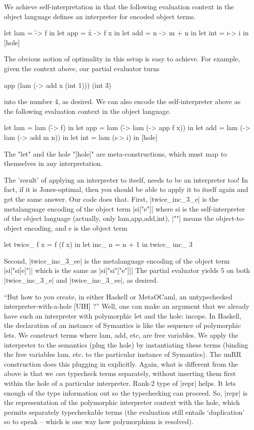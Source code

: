 \documentclass[preprint]{sigplanconf}
\begin{document}
We achieve
self-interpretation in that the following evaluation context in the
object language defines an interpreter for encoded object terms.
\begin{code}
    let lam = \f -> f in
    let app = \f x -> f x in
    let add = \m n -> m + n in
    let int = \i -> i in
    [hole]
\end{code}
The obvious notion of optimality in this setup is easy to achieve.  For
example, given the context above, our partial evaluator turns
\begin{code}
    app (lam (\x -> add x (int 1))) (int 3)
\end{code}
into the number 4, as desired.  We can also encode the self-interpreter
above as the following evaluation context in the object language.
\begin{code}
    let lam = lam (\f -> f) in
    let app = lam (\f -> lam (\x -> app f x)) in
    let add = lam (\m -> lam (\n -> add m n)) in
    let int = lam (\i -> i) in
    [hole]
\end{code}
The "let" and the hole "[hole]" are meta-constructions, which must map to
themselves in any interpretation.  

The 'result' of applying an interpreter to itself, needs to be an 
interpreter too!  In fact, if it is Jones-optimal, then you should be 
able to apply it to itself again and get the same answer.  
Our code does that. First, |twice_inc_3_e| is the
metalanguage encoding of the object term |si["e"]|
where si is the self-interpreter of the object language (actually, only
lam,app,add,int), |""| means the object-to-object encoding, and e is the
object term
\begin{code}
  let twice_ f x = f (f x) in let inc_ n = n + 1 in twice_ inc_ 3
\end{code}

Second, |twice_inc_3_ee| is the metalanguage encoding of the object term
|si["si[e]"]|
which is the same as
|si["si"["e"]]|
The partial evaluator yields 5 on both |twice_inc_3_e| and 
|twice_inc_3_ee|,
as desired.



``But how 
to you create, in either Haskell or MetaOCaml, an untypechecked 
interpreter-with-a-hole [UIH] ?''
Well, one can make an argument that we already have such an
interpreter with polymorphic let and the hole: incope. In Haskell, the
declaration of an instance of Symantics is like the sequence of
polymorphic lets. We construct terms where lam, add, etc, are free
variables. We apply the interpreter to the semantics (plug the hole)
by instantiating these terms (binding the free variables lam, etc. to
the particular instance of Symantics). The unRR construction does
this plugging in explicitly.
Again, what is different from the above is that we \emph{can}
typecheck terms separately, without inserting them first within the
hole of a particular interpreter. Rank-2 type of |repr| helps. It lets
enough of the type information out so the typechecking can
proceed. So, |repr| is the representation of the polymorphic
interpreter context with the hole, which permits separately
typecheckable terms (the evaluation still entails `duplication' so to
speak -- which is one way how polymorphism is resolved).
\end{document}
